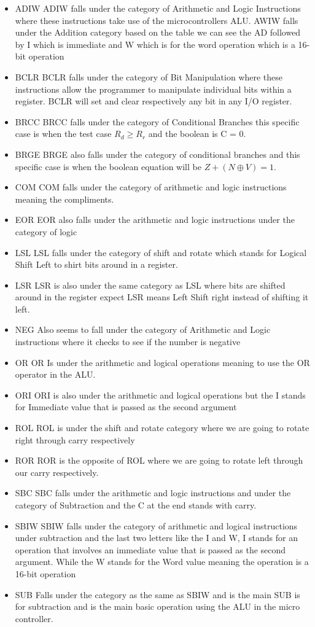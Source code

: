 \documentclass[12pt,letterpaper]{article}
\begin{document}
\begin{enumerate}
\begin{itemize}
\item ADIW
ADIW falls under the category of Arithmetic and Logic Instructions where these instructions take use of the microcontrollers ALU. AWIW falls under the Addition category based on the table we can see the AD followed by I which is immediate and W which is for the word operation which is a 16-bit operation
\item BCLR
BCLR falls under the category of Bit Manipulation where these instructions allow the programmer to manipulate individual bits within a register. BCLR will set and clear respectively any bit in any I/O register.
\item BRCC
BRCC falls under the category of Conditional Branches this specific case is when the test case $R_{d} \geq R_{r}$ and the boolean is C = 0.
\item BRGE
BRGE also falls under the category of conditional branches and this specific case is when the boolean equation will be $Z+(N \oplus V)=1$.
\item COM
COM falls under the category of arithmetic and logic instructions meaning the compliments.
\item EOR
EOR also falls under the arithmetic and logic instructions under the category of logic
\item LSL
LSL falls under the category of shift and rotate which stands for Logical Shift Left to shirt bits around in a register.
\item LSR
LSR is also under the same category as LSL where bits are shifted around in the register expect LSR means Left Shift right instead of shifting it left.
\item NEG
Also seems to fall under the category of Arithmetic and Logic instructions where it checks to see if the number is negative
\item OR
OR Is under the arithmetic and logical operations meaning to use the OR operator in the ALU.
\item ORI
ORI is also under the arithmetic and logical operations but the I stands for Immediate value that is passed as the second argument
\item ROL
ROL is under the shift and rotate category where we are going to rotate right through carry respectively
\item ROR
ROR is the opposite of ROL where we are going to rotate left through our carry respectively.
\item SBC
SBC falls under the arithmetic and logic instructions and under the category of Subtraction and the C at the end stands with carry.
\item SBIW
SBIW falls under the category of arithmetic and logical instructions under subtraction and the last two letters like the I and W, I stands for an operation that involves an immediate value that is passed as the second argument. While the W stands for the Word value meaning the operation is a 16-bit operation
\item SUB
Falls under the category as the same as SBIW and is the main SUB is for subtraction and is the main basic operation using the ALU in the micro controller.
\end{itemize}


\end{enumerate}
\end{document}

